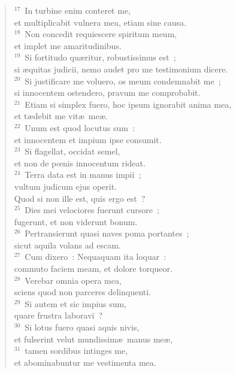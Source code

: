 \begin{flushleft}
\begin{verse}
${}^{17}$~In turbine enim conteret me,\\ et multiplicabit vulnera mea, etiam sine causa.\\
${}^{18}$~Non concedit requiescere spiritum meum,\\ et implet me amaritudinibus.\\
${}^{19}$~Si fortitudo qu\ae ritur, robustissimus est~;\\ si \ae quitas judicii, nemo audet pro me testimonium dicere.\\
${}^{20}$~Si justificare me voluero, os meum condemnabit me~;\\ si innocentem ostendero, pravum me comprobabit.\\
${}^{21}$~Etiam si simplex fuero, hoc ipsum ignorabit anima mea,\\ et t\ae debit me vit\ae\ me\ae .\\
${}^{22}$~Unum est quod locutus sum~:\\ et innocentem et impium ipse consumit.\\
${}^{23}$~Si flagellat, occidat semel,\\ et non de pœnis innocentum rideat.\\
${}^{24}$~Terra data est in manus impii~;\\ vultum judicum ejus operit.\\ Quod si non ille est, quis ergo est~?\\
${}^{25}$~Dies mei velociores fuerunt cursore~;\\ fugerunt, et non viderunt bonum.\\
${}^{26}$~Pertransierunt quasi naves poma portantes~;\\ sicut aquila volans ad escam.\\
${}^{27}$~Cum dixero~: Nequaquam ita loquar~:\\ commuto faciem meam, et dolore torqueor.\\
${}^{28}$~Verebar omnia opera mea,\\ sciens quod non parceres delinquenti.\\
${}^{29}$~Si autem et sic impius sum,\\ quare frustra laboravi~?\\
${}^{30}$~Si lotus fuero quasi aquis nivis,\\ et fulserint velut mundissim\ae\ manus me\ae ,\\
${}^{31}$~tamen sordibus intinges me,\\ et abominabuntur me vestimenta mea.\\

\end{verse}
\end{flushleft}
